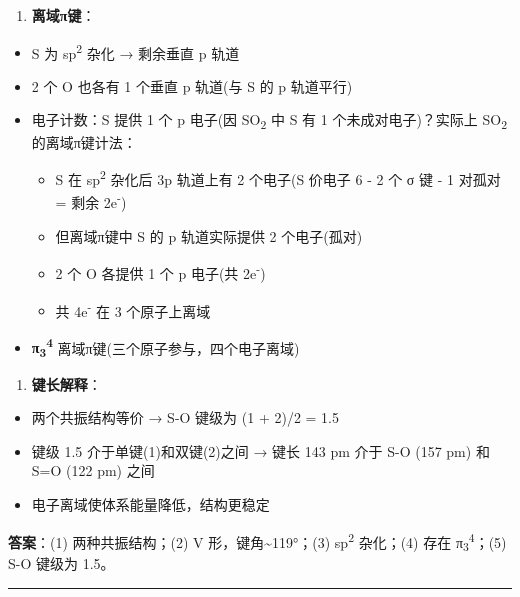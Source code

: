 \begin{enumerate}
\def\labelenumi{(\arabic{enumi})}
\setcounter{enumi}{3}
\tightlist
\item
  \textbf{离域π键}：
\end{enumerate}

\begin{itemize}
\tightlist
\item
  S 为 sp\textsuperscript{2} 杂化 → 剩余垂直 p 轨道
\item
  2 个 O 也各有 1 个垂直 p 轨道(与 S 的 p 轨道平行)
\item
  电子计数：S 提供 1 个 p 电子(因 SO\textsubscript{2} 中 S 有 1 个未成对电子)？实际上 SO\textsubscript{2} 的离域π键计法：

  \begin{itemize}
  \tightlist
  \item
    S 在 sp\textsuperscript{2} 杂化后 3p 轨道上有 2 个电子(S 价电子 6 - 2 个 σ 键 - 1 对孤对 = 剩余 2e\textsuperscript{-})
  \item
    但离域π键中 S 的 p 轨道实际提供 2 个电子(孤对)
  \item
    2 个 O 各提供 1 个 p 电子(共 2e\textsuperscript{-})
  \item
    共 4e\textsuperscript{-} 在 3 个原子上离域
  \end{itemize}
\item
  \textbf{π\textsubscript{3}\textsuperscript{4}} 离域π键(三个原子参与，四个电子离域)
\end{itemize}

\begin{enumerate}
\def\labelenumi{(\arabic{enumi})}
\setcounter{enumi}{4}
\tightlist
\item
  \textbf{键长解释}：
\end{enumerate}

\begin{itemize}
\tightlist
\item
  两个共振结构等价 → S-O 键级为 (1 + 2)/2 = 1.5
\item
  键级 1.5 介于单键(1)和双键(2)之间 → 键长 143 pm 介于 S-O (157 pm) 和 S=O (122 pm) 之间
\item
  电子离域使体系能量降低，结构更稳定
\end{itemize}

\textbf{答案}：(1) 两种共振结构；(2) V 形，键角\textasciitilde119°；(3) sp\textsuperscript{2} 杂化；(4) 存在 π\textsubscript{3}\textsuperscript{4}；(5) S-O 键级为 1.5。

\begin{center}\rule{0.5\linewidth}{0.5pt}\end{center}


